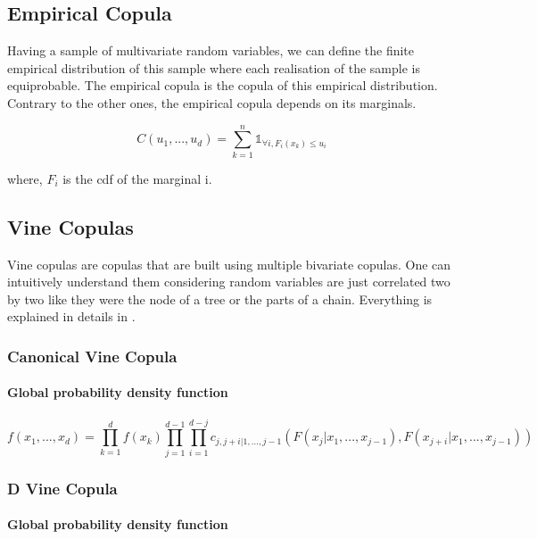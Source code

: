 \documentclass{article}
\begin{document}
	\subsection{Empirical Copula}
	Having a sample of multivariate random variables, we can define the finite empirical distribution of this sample where each realisation of the sample is equiprobable. The empirical copula is the copula of this empirical distribution. Contrary to the other ones, the empirical copula depends on its marginals.
	
	\begin{equation*}
	C(u_1,...,u_d) = \sum_{k=1}^n \mathds{1}_{\forall i, F_i(x_k)\leq u_i} 
	\end{equation*}	
	
	where, $F_i$ is the cdf of the marginal i.
	
	
	\subsection{Vine Copulas}
	
	Vine copulas are copulas that are built using multiple bivariate copulas. One can intuitively understand them considering random variables are just correlated two by two like they were the node of a tree or the parts of a chain. Everything is explained in details in \cite{vineconstruction}.	
	
	\subsubsection{Canonical Vine Copula}
	
	\paragraph{Global probability density function}
	
	\begin{equation*}
		f(x_1,...,x_d)= \prod_{k=1}^d f(x_k) \prod_{j=1}^{d-1} \prod_{i=1}^{d-j} c_{j,j+i|1,...,j-1}(F(x_j|x_1,...,x_{j-1}),F(x_{j+i}|x_1,...,x_{j-1}))
	\end{equation*}
	
	
	\subsubsection{D Vine Copula}

	\paragraph{Global probability density function}
	
\end{document}
